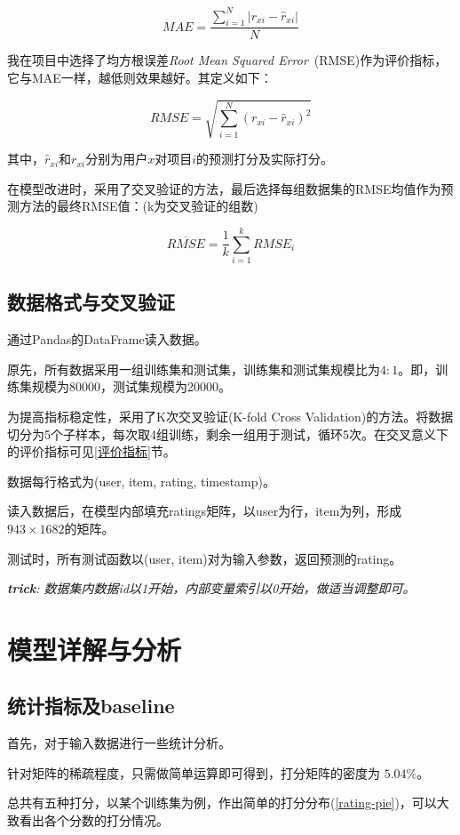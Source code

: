 \documentclass[utf8, a4paper, 11pt, onecolumn]{ctexart}
\begin{document}
\begin{spacing}{1.3}
\[MAE =\frac{\sum_{i=1}^{N} \lvert r_{xi} - \hat{r}_{xi}\rvert}{N} \]

我在项目中选择了均方根误差\textit{Root Mean Squared Error}\ (RMSE)作为评价指标，它与MAE一样，越低则效果越好。其定义如下：

\[RMSE = \sqrt{\sum_{i = 1}^{N}(r_{xi} - \hat{r}_{xi})^{2}}\]

其中，$\hat{r}_{xi}$和$r_{xi}$分别为用户$x$对项目$i$的预测打分及实际打分。

在模型改进时，采用了交叉验证的方法，最后选择每组数据集的RMSE均值作为预测方法的最终RMSE值：(k为交叉验证的组数)

\[\overline{RMSE} = \frac{1}{k}\sum_{i=1}^{k}RMSE_{i}\]


\subsection{数据格式与交叉验证}

通过Pandas的DataFrame读入数据。

原先，所有数据采用一组训练集和测试集，训练集和测试集规模比为$4:1$。即，训练集规模为80000，测试集规模为20000。

为提高指标稳定性，采用了K次交叉验证(K-fold Cross Validation)的方法。将数据切分为5个子样本，每次取4组训练，剩余一组用于测试，循环5次。在交叉意义下的评价指标可见\ref{评价指标}节。

数据每行格式为(user, item, rating, timestamp)。

读入数据后，在模型内部填充ratings矩阵，以user为行，item为列，形成$943 \times 1682$的矩阵。

测试时，所有测试函数以(user, item)对为输入参数，返回预测的rating。

\textit{\textbf{trick}: 数据集内数据id以1开始，内部变量索引以0开始，做适当调整即可。}

\section{模型详解与分析}
\label{模型详解}

\subsection{统计指标及baseline}

首先，对于输入数据进行一些统计分析。

针对矩阵的稀疏程度，只需做简单运算即可得到，打分矩阵的密度为 $5.04\%$。

总共有五种打分，以某个训练集为例，作出简单的打分分布(\ref{rating-pie})，可以大致看出各个分数的打分情况。


\end{spacing}
\end{document}
